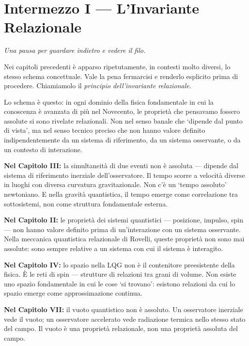\documentclass[12pt,a4paper,openany]{book}
\begin{document}
\chapter*{Intermezzo I — L'Invariante Relazionale}

\begin{center}
\itshape
Una pausa per guardare indietro e vedere il filo.
\end{center}

\bigskip

Nei capitoli precedenti è apparso ripetutamente, in contesti molto diversi, lo stesso schema concettuale. Vale la pena fermarcisi e renderlo esplicito prima di procedere. Chiamiamolo il \textit{principio dell'invariante relazionale}.

Lo schema è questo: in ogni dominio della fisica fondamentale in cui la conoscenza è avanzata di più nel Novecento, le proprietà che pensavamo fossero assolute si sono rivelate relazionali. Non nel senso banale che `dipende dal punto di vista', ma nel senso tecnico preciso che non hanno valore definito indipendentemente da un sistema di riferimento, da un sistema osservante, o da un contesto di interazione.

\textbf{Nel Capitolo III:} la simultaneità di due eventi non è assoluta — dipende dal sistema di riferimento inerziale dell'osservatore. Il tempo scorre a velocità diverse in luoghi con diversa curvatura gravitazionale. Non c'è un `tempo assoluto' newtoniano. E nella gravità quantistica, il tempo emerge come correlazione tra sottosistemi, non come struttura fondamentale esterna.

\textbf{Nel Capitolo II:} le proprietà dei sistemi quantistici — posizione, impulso, spin — non hanno valore definito prima di un'interazione con un sistema osservante. Nella meccanica quantistica relazionale di Rovelli, queste proprietà non sono mai assolute: sono sempre relative a un sistema con cui il sistema è interagito.

\textbf{Nel Capitolo IV:} lo spazio nella LQG non è il contenitore preesistente della fisica. È le reti di spin — strutture di relazioni tra grani di volume. Non esiste uno spazio fondamentale in cui le cose `si trovano': esistono relazioni da cui lo spazio emerge come approssimazione continua.

\textbf{Nel Capitolo VII:} il vuoto quantistico non è assoluto. Un osservatore inerziale vede il vuoto; un osservatore accelerato vede radiazione termica nello stesso stato del campo. Il vuoto è una proprietà relazionale, non una proprietà assoluta del campo.
\end{document}

